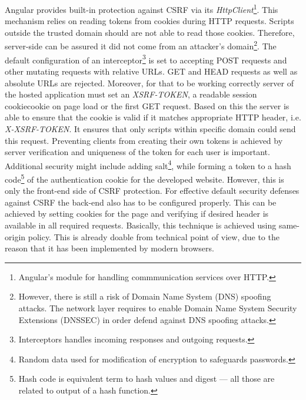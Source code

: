 \documentclass{article} %
\begin{document}
Angular provides built-in protection against CSRF \cite{bib:angular_security} via its \textit{HttpClient}\footnote{Angular's module for handling commmunication services over HTTP.}. This mechanism relies on reading tokens from cookies during HTTP requests. Scripts outside the trusted domain should are not able to read those cookies. Therefore, server-side can be assured it did not come from an attacker's domain\footnote{However, there is still a risk of Domain Name System (DNS) spoofing attacks. The network layer requires to enable Domain Name System Security Extensions (DNSSEC) in order defend against DNS spoofing attacks.}. The default configuration of an interceptor\footnote{Interceptors handles incoming responses and outgoing requests.} is set to accepting POST requests and other mutating requests with relative URLs. GET and HEAD requests as well as absolute URLs are rejected. Moreover, for that to be working correctly server of the hosted application must set an \textit{XSRF-TOKEN}, a readable session cookiecookie on page load or the first GET request. Based on this the server is able to ensure that the cookie is valid if it matches appropriate HTTP header, i.e. \textit{X-XSRF-TOKEN}. It ensures that only scripts within specific domain could send this request. Preventing clients from creating their own tokens is achieved by server verification and uniqueness of the token for each user is important. Additional security might include adding salt\footnote{Random data used for modification of encryption to safeguards passwords.}, while forming a token to a hash code\footnote{Hash code is equivalent term to hash values and digest --- all those are related to output of a hash function.} of the authentication cookie for the developed website. However, this is only the front-end side of CSRF protection. For effective default security defenses against CSRF the back-end also has to be configured properly. This can be achieved by setting cookies for the page and verifying if desired header is available in all required requests. Basically, this technique is achieved using same-origin policy. This is already doable from technical point of view, due to the reason that it has been implemented by modern browsers.\\
\end{document}

